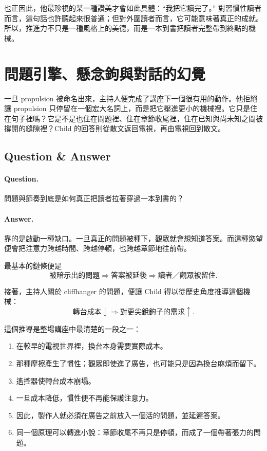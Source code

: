 也正因此，他最珍視的某一種讚美才會如此具體：``我把它讀完了。'' 對習慣性讀者而言，這句話也許聽起來很普通；但對外圍讀者而言，它可能意味著真正的成就。所以，推進力不只是一種風格上的美德，而是一本到書把讀者完整帶到終點的機械。

\section{問題引擎、懸念鉤與對話的幻覺}

一旦 propulsion 被命名出來，主持人便完成了講座下一個很有用的動作。他拒絕讓 propulsion 只停留在一個宏大名詞上，而是把它壓進更小的機械裡。它只是住在句子裡嗎？它是不是也住在問題裡、住在章節收尾裡，住在已知與尚未知之間被撐開的縫隙裡？Child 的回答則從散文返回電視，再由電視回到散文。

\subsection{Question \& Answer}

\paragraph{Question.} 問題與節奏到底是如何真正把讀者拉著穿過一本到書的？

\paragraph{Answer.} 靠的是啟動一種缺口。一旦真正的問題被種下，觀眾就會想知道答案。而這種慾望便會把注意力跨越時間、跨越停頓，也跨越章節地往前帶。

最基本的鏈條便是
\begin{equation}
\text{被暗示出的問題} \Longrightarrow \text{答案被延後} \Longrightarrow \text{讀者／觀眾被留住}.
\end{equation}

接著，主持人關於 cliffhanger 的問題，便讓 Child 得以從歷史角度推導這個機械：
\begin{equation}
\text{轉台成本} \downarrow \Longrightarrow \text{對更尖銳鉤子的需求} \uparrow.
\end{equation}

這個推導是整場講座中最清楚的一段之一：
\begin{enumerate}
\item 在較早的電視世界裡，換台本身需要實際成本。
\item 那種摩擦產生了慣性；觀眾即使進了廣告，也可能只是因為換台麻煩而留下。
\item 遙控器使轉台成本崩塌。
\item 一旦成本降低，慣性便不再能保護注意力。
\item 因此，製作人就必須在廣告之前放入一個活的問題，並延遲答案。
\item 同一個原理可以轉進小說：章節收尾不再只是停頓，而成了一個帶著張力的問題。
\end{enumerate}

